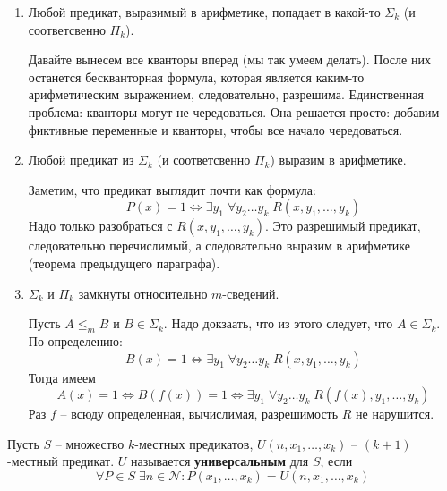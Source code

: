 \begin{enumerate}
    \item Любой предикат, выразимый в арифметике, попадает в какой-то $\Sigma_k$ (и соответсвенно $\Pi_k$).
    
    Давайте вынесем все кванторы вперед (мы так умеем делать). После них останется бескванторная формула, которая является каким-то арифметическим выражением, следовательно, разрешима. Единственная проблема: кванторы могут не чередоваться. Она решается просто: добавим фиктивные переменные и кванторы, чтобы все начало чередоваться.
    \item Любой предикат из $\Sigma_k$ (и соответсвенно $\Pi_k$) выразим в арифметике. 
    
    Заметим, что предикат выглядит почти как формула: \[ P(x) = 1 \Leftrightarrow \exists y_1 \; \forall y_2 \dots y_k \; R(x, y_1, \dots, y_k) \] Надо только разобраться с $R(x, y_1, \dots, y_k)$. Это разрешимый предикат, следовательно перечислимый, а следовательно выразим в арифметике (теорема предыдущего параграфа). 

    \item $\Sigma_k$ и $\Pi_k$ замкнуты относительно $m$-сведений.
    
    Пусть $A \leqslant_m B$ и $B \in \Sigma_k$. Надо докзаать, что из этого следует, что $A \in \Sigma_k$. По определению: \[ B(x) = 1 \Leftrightarrow \exists y_1 \; \forall y_2 \dots y_k \; R(x, y_1, \dots, y_k) \]
    Тогда имеем \[ A(x) = 1 \Leftrightarrow B(f(x)) = 1 \Leftrightarrow \exists y_1 \; \forall y_2 \dots y_k \; R(f(x), y_1, \dots, y_k) \] Раз $f$ -- всюду определенная, вычислимая, разрешимость $R$ не нарушится. 
\end{enumerate}

\begin{conj}
    Пусть $S$ -- множество $k$-местных предикатов, $U(n, x_1, \dots, x_k)$ -- $(k+1)$-местный предикат. $U$ называется \textbf{универсальным} для $S$, если \[ \forall P \in S \; \exists n \in \mathcal{N} : P(x_1, \dots, x_k) = U(n, x_1, \dots, x_k) \]
\end{conj}

